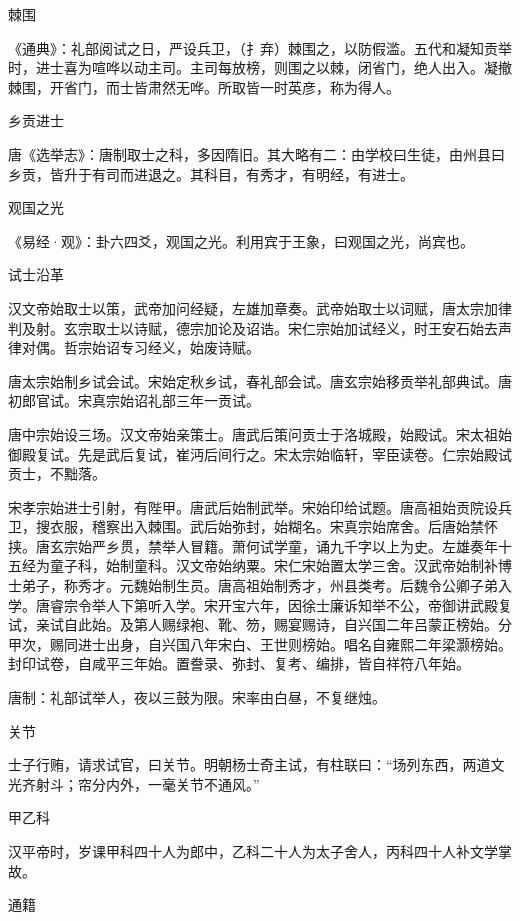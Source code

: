 \documentclass[a4paper,12pt,UTF8,twoside]{ctexbook}
\begin{document}
    棘围
    
    《通典》：礼部阅试之日，严设兵卫，（扌弃）棘围之，以防假滥。五代和凝知贡举时，进士喜为喧哗以动主司。主司每放榜，则围之以棘，闭省门，绝人出入。凝撤棘围，开省门，而士皆肃然无哗。所取皆一时英彦，称为得人。
    
    乡贡进士
    
    唐《选举志》：唐制取士之科，多因隋旧。其大略有二：由学校曰生徒，由州县曰乡贡，皆升于有司而进退之。其科目，有秀才，有明经，有进士。
    
    观国之光
    
    《易经·观》：卦六四爻，观国之光。利用宾于王象，曰观国之光，尚宾也。
    
    试士沿革
    
    汉文帝始取士以策，武帝加问经疑，左雄加章奏。武帝始取士以词赋，唐太宗加律判及射。玄宗取士以诗赋，德宗加论及诏诰。宋仁宗始加试经义，时王安石始去声律对偶。哲宗始诏专习经义，始废诗赋。
    
    唐太宗始制乡试会试。宋始定秋乡试，春礼部会试。唐玄宗始移贡举礼部典试。唐初郎官试。宋真宗始诏礼部三年一贡试。
    
    唐中宗始设三场。汉文帝始亲策士。唐武后策问贡士于洛城殿，始殿试。宋太祖始御殿复试。先是武后复试，崔沔后间行之。宋太宗始临轩，宰臣读卷。仁宗始殿试贡士，不黜落。
    
    宋孝宗始进士引射，有陛甲。唐武后始制武举。宋始印给试题。唐高祖始贡院设兵卫，搜衣服，稽察出入棘围。武后始弥封，始糊名。宋真宗始席舍。后唐始禁怀挟。唐玄宗始严乡贯，禁举人冒籍。萧何试学童，诵九千字以上为史。左雄奏年十五经为童子科，始制童科。汉文帝始纳粟。宋仁宋始置太学三舍。汉武帝始制补博士弟子，称秀才。元魏始制生员。唐高祖始制秀才，州县类考。后魏令公卿子弟入学。唐睿宗令举人下第听入学。宋开宝六年，因徐士廉诉知举不公，帝御讲武殿复试，亲试自此始。及第人赐绿袍、靴、笏，赐宴赐诗，自兴国二年吕蒙正榜始。分甲次，赐同进士出身，自兴国八年宋白、王世则榜始。唱名自雍熙二年梁灏榜始。封印试卷，自咸平三年始。置誊录、弥封、复考、编排，皆自祥符八年始。
    
    唐制：礼部试举人，夜以三鼓为限。宋率由白昼，不复继烛。
    
    关节
    
    士子行贿，请求试官，曰关节。明朝杨士奇主试，有柱联曰：“场列东西，两道文光齐射斗；帘分内外，一毫关节不通风。”
    
    甲乙科
    
    汉平帝时，岁课甲科四十人为郎中，乙科二十人为太子舍人，丙科四十人补文学掌故。
    
    通籍
    
\end{document}
